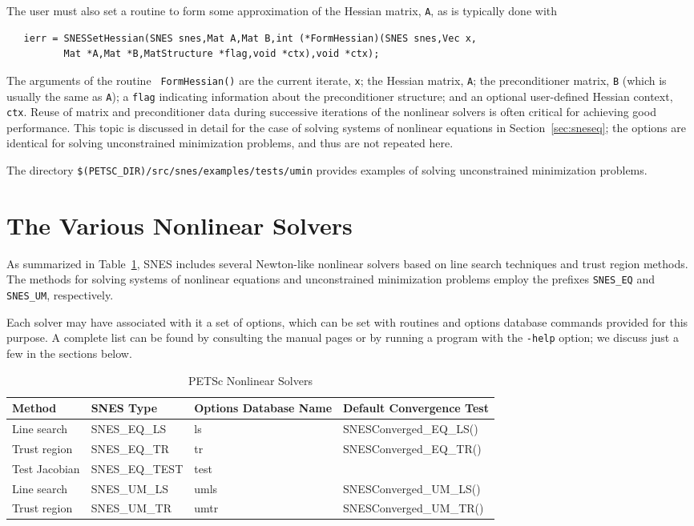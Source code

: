 The user must also set a routine to form some approximation of the Hessian
matrix, {\tt A}, as is typically done with
\begin{verbatim}
   ierr = SNESSetHessian(SNES snes,Mat A,Mat B,int (*FormHessian)(SNES snes,Vec x,
          Mat *A,Mat *B,MatStructure *flag,void *ctx),void *ctx);
\end{verbatim}
The  arguments of the routine {\tt
FormHessian()} are the current iterate, {\tt x}; the Hessian matrix,
{\tt A}; the preconditioner matrix, {\tt B} (which is usually the same
as {\tt A}); a {\tt flag} indicating information about the
preconditioner structure; and an optional user-defined Hessian
context, {\tt ctx}.  Reuse of matrix and preconditioner data during
successive iterations of the nonlinear solvers is often critical for
achieving good performance.  This topic is discussed in detail for the
case of solving systems of nonlinear equations in
Section~\ref{sec:sneseq}; the options are identical for solving
unconstrained minimization problems, and thus are not repeated here.

The directory {\tt \$(PETSC\_DIR)/src/snes/examples/tests/umin} provides
examples of solving unconstrained minimization problems. 

\section{The Various Nonlinear Solvers}
\label{sec:nlsolvers}

As summarized in Table~\ref{tab:snesdefaults}, SNES includes several
Newton-like nonlinear solvers based on line search techniques and
trust region methods.  The methods for solving systems of nonlinear
equations and unconstrained minimization problems employ the prefixes
{\tt SNES\_EQ} and {\tt SNES\_UM}, respectively.  

Each solver may have associated with it a set of options, which can be
set with routines and options database commands provided for this
purpose.  A complete list can be found by consulting the manual pages
or by running a program with the {\tt -help} option; we discuss just a
few in the sections below.

\begin{table}
\begin{center}
\begin{tabular}{llll}
{\bf Method}	&{\bf SNES Type}& {\bf Options Database Name}	&{\bf Default Convergence Test}\\
\hline
Line search     & SNES\_EQ\_LS   & ls	& SNESConverged\_EQ\_LS()\\
Trust region    & SNES\_EQ\_TR   & tr	& SNESConverged\_EQ\_TR()\\
Test Jacobian	& SNES\_EQ\_TEST	& test	& \\
\hline
Line search     & SNES\_UM\_LS   & umls	& SNESConverged\_UM\_LS()\\
Trust region    & SNES\_UM\_TR   & umtr	& SNESConverged\_UM\_TR()\\
\hline
\end{tabular}
\end{center}
\label{tab:snesdefaults}
\caption{PETSc Nonlinear Solvers}
\end{table}

